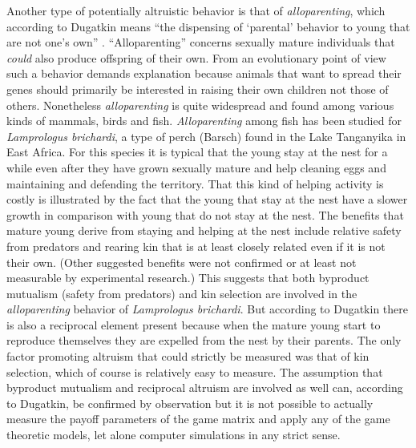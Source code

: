 Another type of potentially altruistic behavior is that of {\em alloparenting},
which according to Dugatkin means ``the dispensing of `parental' behavior to
young that are not one's own'' \cite[p.\ 101]{dugatkin:1997}.
``Alloparenting'' concerns sexually mature individuals that {\em could} also
produce offspring of their own. From an evolutionary point of view such a
behavior demands explanation because animals that want to spread their genes
should primarily be interested in raising their own children not those of
others. Nonetheless {\em alloparenting} is quite widespread and found among
various kinds of mammals, birds and fish. {\em Alloparenting} among fish
has been studied for {\em Lamprologus brichardi}, a type of perch (Barsch)
found in the Lake Tanganyika in East Africa. For this species it is typical
that the young stay at the nest for a while even after they have grown
sexually mature and help cleaning eggs and maintaining and defending the
territory. That this kind of helping activity is costly is illustrated by the
fact that the young that stay at the nest have a slower growth in comparison
with young that do not stay at the nest.  The benefits that mature young
derive from staying and helping at the nest include relative safety from
predators and rearing kin that is at least closely related even if it is not
their own.  (Other suggested benefits were not confirmed or at least not
measurable by experimental research.) This suggests that both byproduct
mutualism (safety from predators) and kin selection are involved in the {\em
  alloparenting} behavior of {\em Lamprologus brichardi}. But according to
Dugatkin there is also a reciprocal element present because when the mature
young start to reproduce themselves they are expelled from the nest by their
parents.\cite[p.\  50]{dugatkin:1997} The only factor promoting altruism that
could strictly be measured was that of kin selection, which of course is
relatively easy to measure. The assumption that byproduct mutualism and
reciprocal altruism are involved as well can, according to Dugatkin, be
confirmed by observation but it is not possible to actually measure the payoff
parameters of the game matrix and apply any of the game theoretic models, let
alone computer simulations in any strict sense.

